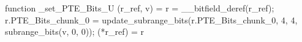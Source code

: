 function _set_PTE_Bits_U (r_ref, v) = {
    r = __bitfield_deref(r_ref);
    r.PTE_Bits_chunk_0 = update_subrange_bits(r.PTE_Bits_chunk_0, 4, 4, subrange_bits(v, 0, 0));
    (*r_ref) = r
}
